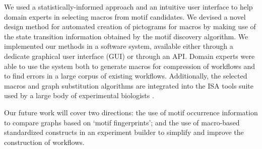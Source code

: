 We used a statistically-informed approach and an intuitive user interface to help domain experts in selecting macros from motif candidates. We devised a novel design method for automated creation of pictograms for macros by making use of the state transition information obtained by the motif discovery algorithm. We implemented our methods in a software system, available either through a dedicate graphical user interface (GUI) or through an API. Domain experts were able to use the system both to generate macros for compression of workflows and to find errors in a large corpus of existing workflows. Additionally, the selected macros and graph substitution algorithms are integrated into the ISA tools suite used by a large body of experimental biologists \cite{sansone12}. 


Our future work will cover two directions: the use of motif occurrence information to compare graphs based on `motif fingerprints'; and the use of macro-based standardized constructs in an experiment builder to simplify and improve the construction of workflows. 
